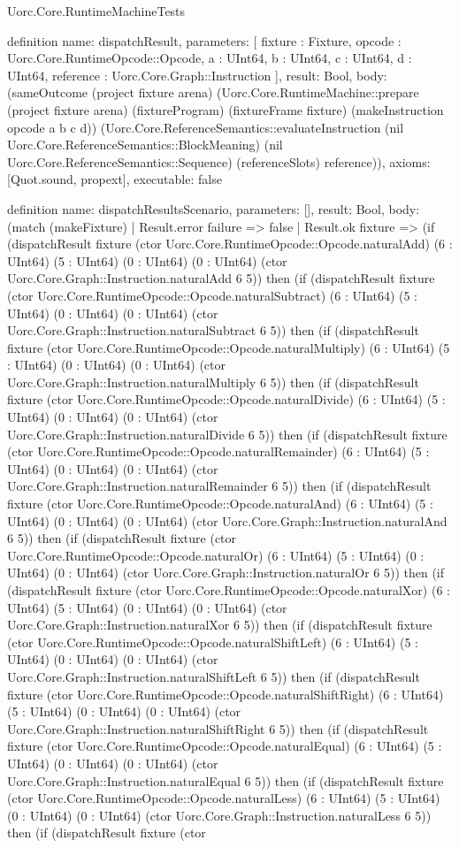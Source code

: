 \begin{lexlean}{Uorc.Core.RuntimeMachineTests}
\begin{semanticmodule}
definition{
  name: dispatchResult,
  parameters: [
    fixture : Fixture,
    opcode : Uorc.Core.RuntimeOpcode::Opcode,
    a : UInt64,
    b : UInt64,
    c : UInt64,
    d : UInt64,
    reference : Uorc.Core.Graph::Instruction
  ],
  result: Bool,
  body: (sameOutcome (project fixture arena) (Uorc.Core.RuntimeMachine::prepare (project fixture arena) (fixtureProgram) (fixtureFrame fixture) (makeInstruction opcode a b c d)) (Uorc.Core.ReferenceSemantics::evaluateInstruction (nil Uorc.Core.ReferenceSemantics::BlockMeaning) (nil Uorc.Core.ReferenceSemantics::Sequence) (referenceSlots) reference)),
  axioms: [Quot.sound, propext],
  executable: false
}

definition{
  name: dispatchResultsScenario,
  parameters: [],
  result: Bool,
  body: (match (makeFixture)
    | Result.error failure => false
    | Result.ok fixture => (if (dispatchResult fixture (ctor Uorc.Core.RuntimeOpcode::Opcode.naturalAdd) (6 : UInt64) (5 : UInt64) (0 : UInt64) (0 : UInt64) (ctor Uorc.Core.Graph::Instruction.naturalAdd 6 5)) then (if (dispatchResult fixture (ctor Uorc.Core.RuntimeOpcode::Opcode.naturalSubtract) (6 : UInt64) (5 : UInt64) (0 : UInt64) (0 : UInt64) (ctor Uorc.Core.Graph::Instruction.naturalSubtract 6 5)) then (if (dispatchResult fixture (ctor Uorc.Core.RuntimeOpcode::Opcode.naturalMultiply) (6 : UInt64) (5 : UInt64) (0 : UInt64) (0 : UInt64) (ctor Uorc.Core.Graph::Instruction.naturalMultiply 6 5)) then (if (dispatchResult fixture (ctor Uorc.Core.RuntimeOpcode::Opcode.naturalDivide) (6 : UInt64) (5 : UInt64) (0 : UInt64) (0 : UInt64) (ctor Uorc.Core.Graph::Instruction.naturalDivide 6 5)) then (if (dispatchResult fixture (ctor Uorc.Core.RuntimeOpcode::Opcode.naturalRemainder) (6 : UInt64) (5 : UInt64) (0 : UInt64) (0 : UInt64) (ctor Uorc.Core.Graph::Instruction.naturalRemainder 6 5)) then (if (dispatchResult fixture (ctor Uorc.Core.RuntimeOpcode::Opcode.naturalAnd) (6 : UInt64) (5 : UInt64) (0 : UInt64) (0 : UInt64) (ctor Uorc.Core.Graph::Instruction.naturalAnd 6 5)) then (if (dispatchResult fixture (ctor Uorc.Core.RuntimeOpcode::Opcode.naturalOr) (6 : UInt64) (5 : UInt64) (0 : UInt64) (0 : UInt64) (ctor Uorc.Core.Graph::Instruction.naturalOr 6 5)) then (if (dispatchResult fixture (ctor Uorc.Core.RuntimeOpcode::Opcode.naturalXor) (6 : UInt64) (5 : UInt64) (0 : UInt64) (0 : UInt64) (ctor Uorc.Core.Graph::Instruction.naturalXor 6 5)) then (if (dispatchResult fixture (ctor Uorc.Core.RuntimeOpcode::Opcode.naturalShiftLeft) (6 : UInt64) (5 : UInt64) (0 : UInt64) (0 : UInt64) (ctor Uorc.Core.Graph::Instruction.naturalShiftLeft 6 5)) then (if (dispatchResult fixture (ctor Uorc.Core.RuntimeOpcode::Opcode.naturalShiftRight) (6 : UInt64) (5 : UInt64) (0 : UInt64) (0 : UInt64) (ctor Uorc.Core.Graph::Instruction.naturalShiftRight 6 5)) then (if (dispatchResult fixture (ctor Uorc.Core.RuntimeOpcode::Opcode.naturalEqual) (6 : UInt64) (5 : UInt64) (0 : UInt64) (0 : UInt64) (ctor Uorc.Core.Graph::Instruction.naturalEqual 6 5)) then (if (dispatchResult fixture (ctor Uorc.Core.RuntimeOpcode::Opcode.naturalLess) (6 : UInt64) (5 : UInt64) (0 : UInt64) (0 : UInt64) (ctor Uorc.Core.Graph::Instruction.naturalLess 6 5)) then (if (dispatchResult fixture (ctor }
\end{semanticmodule}
\end{lexlean}
